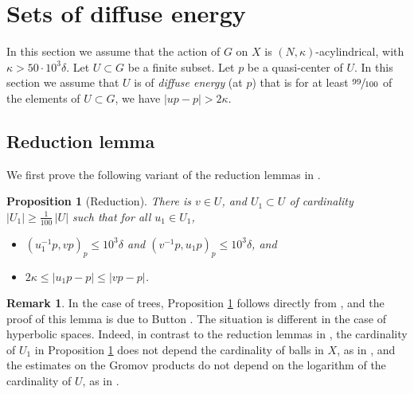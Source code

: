\documentclass[11pt]{article}
\theoremstyle{plain}
\newtheorem{prop}[thm]{Proposition}
\theoremstyle{definition}
\newtheorem{rem}[thm]{Remark}
\begin{document}
\section{Sets of diffuse energy}
In this section we assume that the action of $G$ on $X$ is $(N, \kappa)$-acylindrical, with $\kappa > 50\cdot 10^3\delta$.
Let $U \subset G$ be a finite subset.
Let $p$ be a quasi-center of $U$.
In this section we assume that $U$ is of \emph{diffuse energy} (at $p$) that is for at least $\sfrac{99}{100}$ of the elements of $U\subset G$, we have $ |up-p|> 2\kappa$.

\subsection{Reduction lemma}

We first prove the following variant of the reduction lemmas in \cite{delzant_product_2020}.

\begin{prop}[Reduction]\label{L: reduction}
There is $v\in U$, and $U_1\subset U$ of cardinality $|U_1|\geqslant \frac{1}{100}\, |U|$ such that for all $u_1\in U_1$,
\begin{itemize}
\item $(u_1^{-1}p,vp)_p\leqslant 10^3 \delta$ and $(v^{-1}p,u_1p)_p\leqslant 10^3 \delta$, and
\item $2\kappa \leqslant |u_1p-p|\leqslant |vp-p|$.
\end{itemize}
\end{prop}

\begin{rem} In the case of trees, Proposition \ref{L: reduction} follows directly from \cite[Lem.\,6.4]{delzant_product_2020}, and the proof of this lemma is due to Button \cite{button_explicit_2013}. The situation is different in the case of hyperbolic spaces. Indeed, in contrast to the reduction lemmas in \cite[\S 6.1]{delzant_product_2020}, the cardinality of $U_1$ in Proposition \ref{L: reduction} does not depend the cardinality of balls in $X$, as in \cite[Lem.\,6.3]{delzant_product_2020}, and the estimates on the Gromov products do not depend on the logarithm of the cardinality of $U$, as in \cite[Lem.\,6.8]{delzant_product_2020}.
\end{rem}
\end{document}
